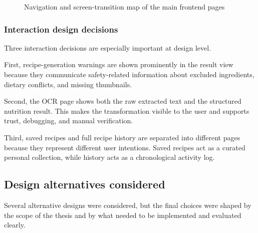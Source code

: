\begin{figure}[H]
	\centering
	\caption{Navigation and screen-transition map of the main frontend pages}
	\label{fig:design-screen-flow}
\end{figure}

\subsubsection{Interaction design decisions}

Three interaction decisions are especially important at design level.

First, recipe-generation warnings are shown prominently in the result
view because they communicate safety-related information about excluded
ingredients, dietary conflicts, and missing thumbnails.

Second, the OCR page shows both the raw extracted text and the
structured nutrition result. This makes the transformation visible to
the user and supports trust, debugging, and manual verification.

Third, saved recipes and full recipe history are separated into
different pages because they represent different user intentions.
Saved recipes act as a curated personal collection, while history acts
as a chronological activity log.

\subsection{Design alternatives considered}

Several alternative designs were considered, but the final choices were
shaped by the scope of the thesis and by what needed to be implemented
and evaluated clearly.

